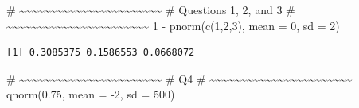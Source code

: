 \documentclass[
  letterpaper,
  DIV=11,
  numbers=noendperiod]{scrreprt}
\newenvironment{Shaded}{\begin{snugshade}}{\end{snugshade}}
\newcommand{\AttributeTok}[1]{\textcolor[rgb]{0.40,0.45,0.13}{#1}}
\newcommand{\CommentTok}[1]{\textcolor[rgb]{0.37,0.37,0.37}{#1}}
\newcommand{\DecValTok}[1]{\textcolor[rgb]{0.68,0.00,0.00}{#1}}
\newcommand{\FloatTok}[1]{\textcolor[rgb]{0.68,0.00,0.00}{#1}}
\newcommand{\FunctionTok}[1]{\textcolor[rgb]{0.28,0.35,0.67}{#1}}
\newcommand{\NormalTok}[1]{\textcolor[rgb]{0.00,0.23,0.31}{#1}}
\newcommand{\SpecialCharTok}[1]{\textcolor[rgb]{0.37,0.37,0.37}{#1}}
\begin{document}
\begin{Shaded}
\begin{Highlighting}[]
\CommentTok{\# \textasciitilde{}\textasciitilde{}\textasciitilde{}\textasciitilde{}\textasciitilde{}\textasciitilde{}\textasciitilde{}\textasciitilde{}\textasciitilde{}\textasciitilde{}\textasciitilde{}\textasciitilde{}\textasciitilde{}\textasciitilde{}\textasciitilde{}\textasciitilde{}\textasciitilde{}\textasciitilde{}\textasciitilde{}\textasciitilde{}\textasciitilde{}\textasciitilde{}\textasciitilde{}}
\CommentTok{\# Questions 1, 2, and 3}
\CommentTok{\# \textasciitilde{}\textasciitilde{}\textasciitilde{}\textasciitilde{}\textasciitilde{}\textasciitilde{}\textasciitilde{}\textasciitilde{}\textasciitilde{}\textasciitilde{}\textasciitilde{}\textasciitilde{}\textasciitilde{}\textasciitilde{}\textasciitilde{}\textasciitilde{}\textasciitilde{}\textasciitilde{}\textasciitilde{}\textasciitilde{}\textasciitilde{}\textasciitilde{}\textasciitilde{}}
\DecValTok{1} \SpecialCharTok{{-}} \FunctionTok{pnorm}\NormalTok{(}\FunctionTok{c}\NormalTok{(}\DecValTok{1}\NormalTok{,}\DecValTok{2}\NormalTok{,}\DecValTok{3}\NormalTok{), }\AttributeTok{mean =} \DecValTok{0}\NormalTok{, }\AttributeTok{sd =} \DecValTok{2}\NormalTok{)}
\end{Highlighting}
\end{Shaded}

\begin{verbatim}
[1] 0.3085375 0.1586553 0.0668072
\end{verbatim}

\begin{Shaded}
\begin{Highlighting}[]
\CommentTok{\# \textasciitilde{}\textasciitilde{}\textasciitilde{}\textasciitilde{}\textasciitilde{}\textasciitilde{}\textasciitilde{}\textasciitilde{}\textasciitilde{}\textasciitilde{}\textasciitilde{}\textasciitilde{}\textasciitilde{}\textasciitilde{}\textasciitilde{}\textasciitilde{}\textasciitilde{}\textasciitilde{}\textasciitilde{}\textasciitilde{}\textasciitilde{}\textasciitilde{}\textasciitilde{}}
\CommentTok{\# Q4}
\CommentTok{\# \textasciitilde{}\textasciitilde{}\textasciitilde{}\textasciitilde{}\textasciitilde{}\textasciitilde{}\textasciitilde{}\textasciitilde{}\textasciitilde{}\textasciitilde{}\textasciitilde{}\textasciitilde{}\textasciitilde{}\textasciitilde{}\textasciitilde{}\textasciitilde{}\textasciitilde{}\textasciitilde{}\textasciitilde{}\textasciitilde{}\textasciitilde{}\textasciitilde{}\textasciitilde{}}
\FunctionTok{qnorm}\NormalTok{(}\FloatTok{0.75}\NormalTok{, }\AttributeTok{mean =} \SpecialCharTok{{-}}\DecValTok{2}\NormalTok{, }\AttributeTok{sd =} \DecValTok{500}\NormalTok{)}
\end{Highlighting}
\end{Shaded}
\end{document}
